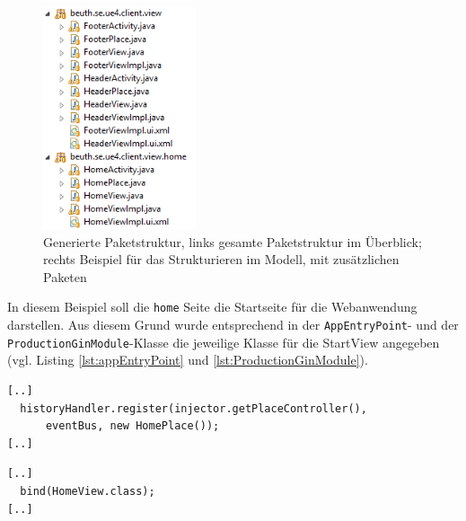 \begin{figure}[htbp]
\begin{center}
\includegraphics[width=0.4\textwidth]{./img/PackagesExample.png}
\caption{Generierte Paketstruktur, links gesamte
Paketstruktur im Überblick; rechts Beispiel für das
Strukturieren im Modell, mit zusätzlichen Paketen}\label{Fig:packegeModel}
\end{center}
\end{figure}
 
In diesem Beispiel soll die \texttt{home} Seite die Startseite für die
Webanwendung darstellen. Aus diesem Grund wurde entsprechend in der
\texttt{AppEntryPoint}- und der \texttt{ProductionGinModule}-Klasse die
jeweilige Klasse für die StartView angegeben (vgl. Listing
\ref{lst:appEntryPoint} und \ref{lst:ProductionGinModule}).
\lstset{language=gwt}
\begin{lstlisting}[caption={Änderung an der \texttt{AppEntryPoint}-Klasse zur
Bestimmung der Startseite}, label={lst:appEntryPoint}] 
[..]
  historyHandler.register(injector.getPlaceController(), 
      eventBus, new HomePlace());
[..]
\end{lstlisting}
\lstset{language=gwt}
\begin{lstlisting}[caption={Änderung an der \texttt{ProductionGinModule}-Klasse
zur Bestimmung der Startseite}, label={lst:ProductionGinModule}] 
[..]
  bind(HomeView.class);
[..]
\end{lstlisting}

